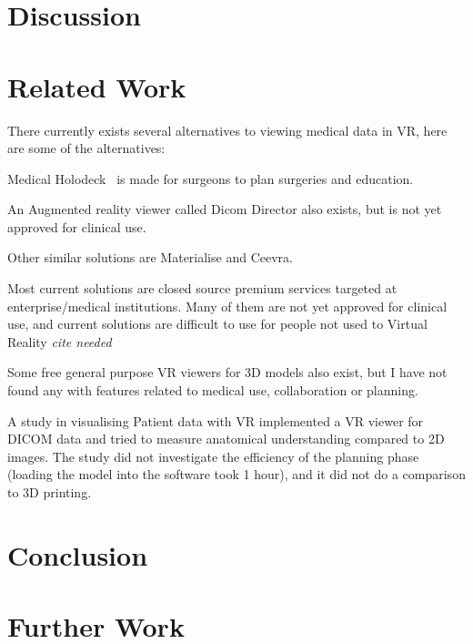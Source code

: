 \documentclass[a4paper]{report}
\begin{document}
\chapter{Discussion}\label{Discussion}

\chapter{Related Work}\label{Related Work}

There currently exists several alternatives to viewing medical data in VR, here are some of the alternatives:

Medical Holodeck~\cite{medical_holodeck_medicalholodeck_nodate} is made for surgeons to plan surgeries and education.

An Augmented reality viewer called Dicom Director also exists, but is not yet approved for clinical use.\cite{dicomdirectorcom_surgeons_nodate}

Other similar solutions are Materialise\cite{materialise_medical_nodate} and
Ceevra\cite{ceevra_inc_using_2019}.

Most current solutions are closed source premium services targeted at enterprise/medical institutions. Many of them are not yet approved for clinical use, and current solutions are difficult to use for people not used to Virtual Reality \emph{cite needed}

Some free general purpose VR viewers for 3D models also exist, but I have not found any with features related to medical use, collaboration or planning.

A study in visualising Patient data with VR \cite{vertemati_virtual_2019} implemented a VR viewer for DICOM data and tried to measure anatomical understanding compared to 2D images. The study did not investigate the efficiency of the planning phase (loading the model into the software took 1 hour), and it did not do a comparison to 3D printing.

\chapter{Conclusion} \label{Conclusion}

\chapter{Further Work} \label{Further Work}

\appendix



%
%
\printbibliography
\end{document}

